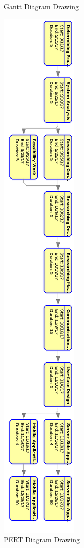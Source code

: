 \begin{figure}[!htbp]
\caption{Gantt Diagram Drawing}
\label{fig:ganttDeneme}
\end{figure}

\begin{figure}[!htbp]
\centering
\includegraphics[scale = 0.7]{projectChapters/images/pert.png}
\caption{PERT Diagram Drawing}
\label{fig:pertDiagram}
\end{figure}


